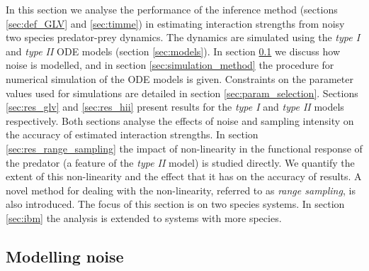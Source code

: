 In this section we analyse the performance of the inference method (sections \ref{sec:def_GLV} and \ref{sec:timme}) in estimating interaction strengths from noisy two species predator-prey dynamics. The dynamics are simulated using the \emph{type I} and \emph{type II} ODE models (section \ref{sec:models}). In section \ref{sec:noise} we discuss how noise is modelled, and in section \ref{sec:simulation_method} the procedure for numerical simulation of the ODE models is given. Constraints on the parameter values used for simulations are detailed in section \ref{sec:param_selection}. Sections \ref{sec:res_glv} and \ref{sec:res_hii} present results for the \emph{type I} and \emph{type II} models respectively. Both sections analyse the effects of noise and sampling intensity on the accuracy of estimated interaction strengths. In section \ref{sec:res_range_sampling} the impact of non-linearity in the functional response of the predator (a feature of the \emph{type II} model) is studied directly. We quantify the extent of this non-linearity and the effect that it has on the accuracy of results. A novel method for dealing with the non-linearity, referred to as \emph{range sampling}, is also introduced. The focus of this section is on two species systems. In section \ref{sec:ibm} the analysis is extended to systems with more species.

\subsection{Modelling noise}
\label{sec:noise}


